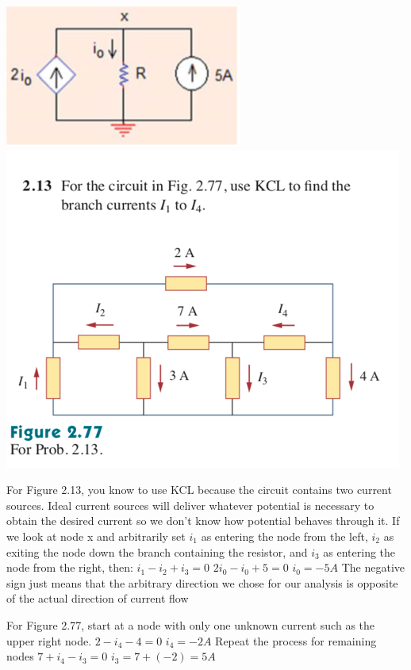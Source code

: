 \documentclass[11pt]{book}
\begin{document}
\begin{center}
	\includegraphics{figures/04.example2.png}
\\
\includegraphics{figures/04.example3.png}

\end{center}

For Figure 2.13, you know to use KCL because the circuit contains two current sources. Ideal current sources will deliver whatever potential is necessary to obtain the desired current so we don't know how potential behaves through it.
If we look at node x and arbitrarily set $i_1$ as entering the node from the left, $i_2$ as exiting the node down the branch containing the resistor, and $i_3$ as entering the node from the right, then:
\subitem $i_1 - i_2 + i_3 = 0$
\subitem $2i_0 - i_0 + 5 = 0$
\subitem $i_0 = - 5 A $
The negative sign just means that the arbitrary direction we chose for our analysis is opposite of the actual direction of current flow

For Figure 2.77, start at a node with only one unknown current such as the upper right node.
\subitem $2 - i_4 - 4 = 0$
\subitem $i_4 = -2 A$
Repeat the process for remaining nodes
\subitem $7 + i_4 - i_3 = 0$
\subitem $i_3 = 7 + (-2) = 5 A$
\end{document}
